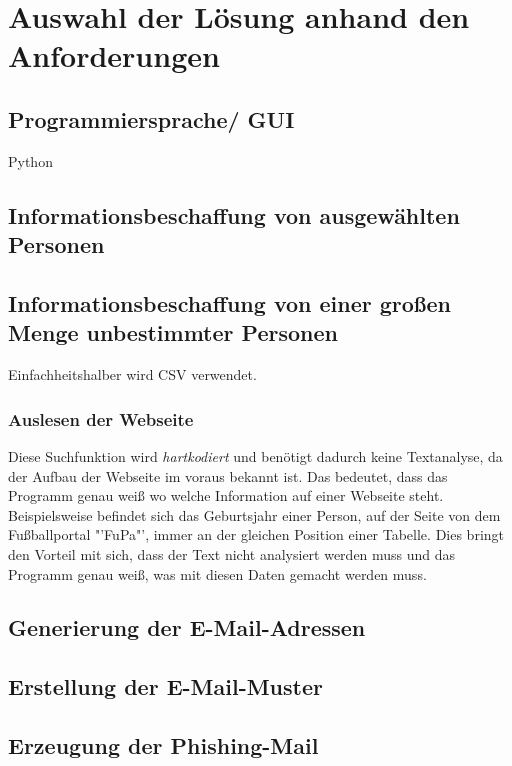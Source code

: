 

\chapter{Auswahl der Lösung anhand den Anforderungen}  %
\label{cha:Auswahl der Lösung anhand Anforderungen} %
\section{Programmiersprache/ GUI}
Python
\section{Informationsbeschaffung von ausgewählten Personen}
	
\section{Informationsbeschaffung von einer großen Menge unbestimmter Personen}
Einfachheitshalber wird CSV verwendet.
	\subsection{Auslesen der Webseite}
	Diese Suchfunktion wird \textit{hartkodiert} und benötigt dadurch keine Textanalyse, da der Aufbau der Webseite im voraus bekannt ist. Das bedeutet, dass das Programm genau weiß wo welche Information auf einer Webseite steht. Beispielsweise befindet sich das Geburtsjahr einer Person, auf der Seite von dem Fußballportal "'FuPa"', immer an der gleichen Position einer Tabelle. Dies bringt den Vorteil mit sich, dass der Text nicht analysiert werden muss und das Programm genau weiß, was mit diesen Daten gemacht werden muss.
\section{Generierung der E-Mail-Adressen}

\section{Erstellung der E-Mail-Muster}

\section{Erzeugung der Phishing-Mail}